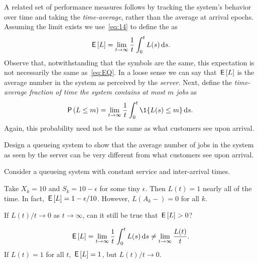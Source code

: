 \documentclass[companion]{subfiles}
\begin{document}
A related set of performance measures follows by tracking the system's behavior over time and taking the \emph{time-average}, rather than the average at arrival epochs.
Assuming the limit exists we use~\cref{eq:14} to define the  as
\begin{equation}
 \label{eq:46}
 \,\mathsf{E}\left[L\right] = \lim_{t\to\infty} \frac 1 t\int_0^t L(s) \,\text{d}s.
\end{equation}
Observe that, notwithstanding that the symbols are the same, this expectation is not necessarily the same as~\cref{eq:EQ}.
In a loose sense we can say that $\,\mathsf{E}\left[L\right]$ is the average number in the system as perceived by the \emph{server}.
Next, define the \emph{time-average fraction of time the system contains at most $m$ jobs} as
\begin{equation}
 \label{eq:47}
 \P{L\leq m} =\lim_{t\to\infty} \frac 1 t\int_0^t \1{L(s)\leq m} \d s.
\end{equation}
Again, this probability need not be the same as what customers see upon arrival.


\begin{exercise}
Design a queueing system to show that the average number of jobs in the system as seen by the server can be very different from what customers see upon arrival.
\begin{hint}
Consider a queueing system with constant service and inter-arrival times.
\end{hint}
\begin{solution}
 Take $X_k = 10$ and $S_k = 10-\epsilon$ for some tiny
 $\epsilon$. Then $L(t) = 1$ nearly all of the time. In fact,
 $\,\mathsf{E}\left[L\right] = 1-\epsilon/10$. However, $L(A_k-)=0$ for all $k$.
\end{solution}
\end{exercise}


\begin{extra}
 If $L(t)/t \to 0$ as $t\to\infty$, can it still be true that $\,\mathsf{E}\left[L\right]>0$? 
\begin{solution}
 \begin{equation*}
 \,\mathsf{E}\left[L\right] = \lim_{t\to\infty} \frac 1 t \int_0^t L(s) \,\text{d}s \neq \lim_{t\to\infty} \frac{L(t)}t.
 \end{equation*}
If $L(t)=1$ for all $t$, $\,\mathsf{E}\left[L\right] =1 $, but $L(t)/t \to 0$. 
\end{solution}
\end{extra}
\end{document}
